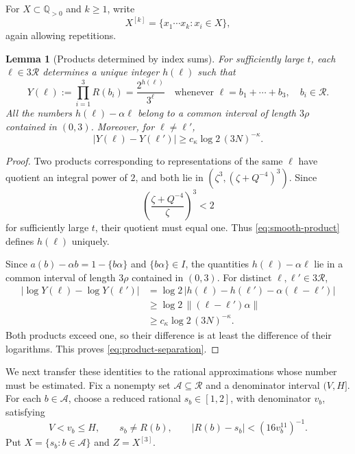 \documentclass[11pt,reqno]{amsart}
\theoremstyle{definition}
\newcommand{\Q}{\mathbb Q}
\theoremstyle{plain}
\newtheorem{lemma}{Lemma}[section]
\theoremstyle{definition}
\theoremstyle{remark}
\newcommand{\RR}{\mathcal R}
\newcommand{\Bad}{\mathcal A}
\newcommand{\norm}[1]{\lVert#1\rVert}
\begin{document}
For $X\subset\Q_{>0}$ and $k\ge1$, write
\[
 X^{[k]}=\{x_1\cdots x_k:x_i\in X\},
\]
again allowing repetitions.

\begin{lemma}[Products determined by index sums]
\label{lem:smooth-products}
For sufficiently large $t$, each $\ell\in3\RR$
determines a unique integer $h(\ell)$ such that
\begin{equation}\label{eq:smooth-product}
 Y(\ell):=\prod_{i=1}^3R(b_i)
 =\frac{2^{h(\ell)}}{3^\ell}
 \quad\text{whenever }\ell=b_1+\cdots+b_3,
 \quad b_i\in\RR.
\end{equation}
All the numbers $h(\ell)-\alpha\ell$ belong to
a common interval of length $3\rho$ contained
in $(0,3)$. Moreover, for $\ell\ne\ell'$,
\begin{equation}\label{eq:product-separation}
 |Y(\ell)-Y(\ell')|
 \ge c_\kappa\log2\,(3N)^{-\kappa}.
\end{equation}
\end{lemma}

\begin{proof}
Two products corresponding to representations
of the same $\ell$ have quotient an integral
power of $2$, and both lie in
$(\zeta^3,(\zeta+Q^{-4})^3)$. Since
\[
 \left(\frac{\zeta+Q^{-4}}{\zeta}\right)^3<2
\]
for sufficiently large $t$, their quotient
must equal one. Thus \eqref{eq:smooth-product}
defines $h(\ell)$ uniquely.

Since $a(b)-\alpha b=1-\{b\alpha\}$ and
$\{b\alpha\}\in I$, the quantities
$h(\ell)-\alpha\ell$ lie in a common
interval of length $3\rho$ contained in
$(0,3)$. For distinct $\ell,\ell'\in3\RR$,
\[
 \begin{aligned}
 |\log Y(\ell)-\log Y(\ell')|
 &=\log2\,|h(\ell)-h(\ell')
       -\alpha(\ell-\ell')|\\
 &\ge\log2\,\norm{(\ell-\ell')\alpha}\\
 &\ge c_\kappa\log2\,(3N)^{-\kappa}.
 \end{aligned}
\]
Both products exceed one, so their difference
is at least the difference of their logarithms.
This proves \eqref{eq:product-separation}.
\end{proof}

We next transfer these identities to the rational
approximations whose number must be estimated.
Fix a nonempty set $\Bad\subseteq\RR$ and a
denominator interval $(V,H]$. For each $b\in\Bad$,
choose a reduced rational $s_b\in[1,2]$, with
denominator $v_b$, satisfying
\begin{equation}\label{eq:assignment}
 V<v_b\le H,\qquad s_b\ne R(b),\qquad
 |R(b)-s_b|<(16v_b^{11})^{-1}.
\end{equation}
Put $X=\{s_b:b\in\Bad\}$ and $Z=X^{[3]}$.
\end{document}
